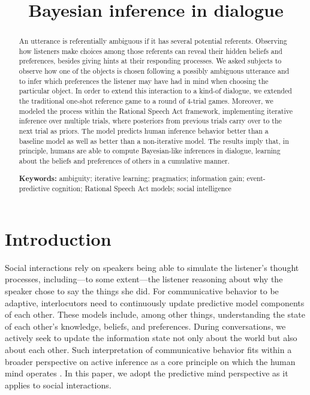 \documentclass[10pt,a4paper]{article}
\title{Bayesian inference in dialogue}
\begin{document}
\maketitle

\begin{abstract}
	
An utterance is referentially ambiguous if it has several potential referents.
Observing how listeners make choices among those referents can reveal their hidden beliefs and preferences, besides giving hints at their responding processes.
We asked subjects to observe how one of the objects is chosen following a possibly ambiguous utterance and to infer which preferences the listener may have had in mind when choosing the particular object.
In order to extend this interaction to a kind-of dialogue, we extended the traditional one-shot reference game to a round of 4-trial games.
Moreover, we modeled the process within the Rational Speech Act framework, implementing iterative inference over multiple trials,
where posteriors from previous trials carry over to the next trial as priors. %
The model predicts human inference behavior better than a baseline model as well as better than a non-iterative model. 
The results imply that, in principle, humans are able to compute Bayesian-like inferences in dialogue, learning about the beliefs and preferences of others in a cumulative manner.
                                                     

\textbf{Keywords:} 
ambiguity; iterative learning; pragmatics; information gain; event-predictive cognition; Rational Speech Act models; social intelligence
\end{abstract}


\section{Introduction}

Social interactions rely on speakers being able to simulate the listener's thought processes, including---to some extent---the listener reasoning about why the speaker chose to say the things she did.
For communicative behavior to be adaptive, interlocutors need to continuously update predictive model components of each other.
These models include, among other things, understanding the state of each other's knowledge, beliefs, and preferences.
During conversations, we actively seek to update the information state not only about the world but also about each other.
Such interpretation of communicative behavior fits within a broader perspective on active inference as a core principle on which the human mind operates \cite{Friston:2015b}.
In this paper, we adopt the predictive mind perspective as it applies to social interactions.
\end{document}
